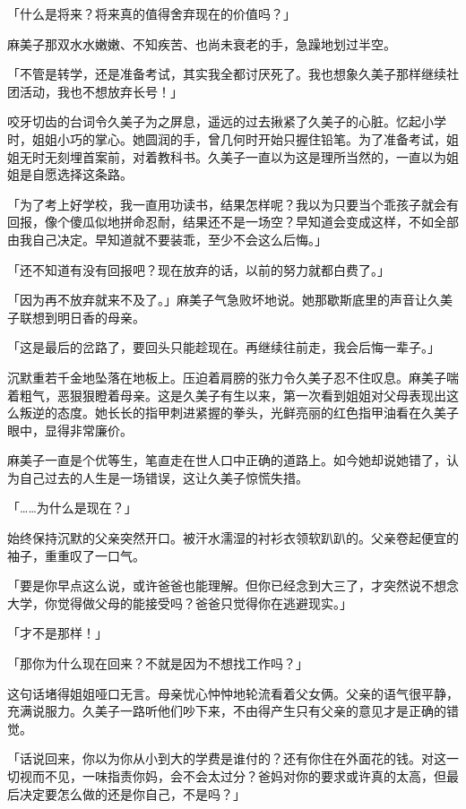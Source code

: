 \documentclass[UTF8]{ctexart}
\begin{document}
    「什么是将来？将来真的值得舍弃现在的价值吗？」 

    麻美子那双水水嫩嫩、不知疾苦、也尚未衰老的手，急躁地划过半空。 

    「不管是转学，还是准备考试，其实我全都讨厌死了。我也想象久美子那样继续社团活动，我也不想放弃长号！」 

    咬牙切齿的台词令久美子为之屏息，遥远的过去揪紧了久美子的心脏。忆起小学时，姐姐小巧的掌心。她圆润的手，曾几何时开始只握住铅笔。为了准备考试，姐姐无时无刻埋首案前，对着教科书。久美子一直以为这是理所当然的，一直以为姐姐是自愿选择这条路。 

    「为了考上好学校，我一直用功读书，结果怎样呢？我以为只要当个乖孩子就会有回报，像个傻瓜似地拼命忍耐，结果还不是一场空？早知道会变成这样，不如全部由我自己决定。早知道就不要装乖，至少不会这么后悔。」 

    「还不知道有没有回报吧？现在放弃的话，以前的努力就都白费了。」 

    「因为再不放弃就来不及了。」麻美子气急败坏地说。她那歇斯底里的声音让久美子联想到明日香的母亲。 

    「这是最后的岔路了，要回头只能趁现在。再继续往前走，我会后悔一辈子。」 

    沉默重若千金地坠落在地板上。压迫着肩膀的张力令久美子忍不住叹息。麻美子喘着粗气，恶狠狠瞪着母亲。这是久美子有生以来，第一次看到姐姐对父母表现出这么叛逆的态度。她长长的指甲刺进紧握的拳头，光鲜亮丽的红色指甲油看在久美子眼中，显得非常廉价。 

    麻美子一直是个优等生，笔直走在世人口中正确的道路上。如今她却说她错了，认为自己过去的人生是一场错误，这让久美子惊慌失措。 

    「……为什么是现在？」 

    始终保持沉默的父亲突然开口。被汗水濡湿的衬衫衣领软趴趴的。父亲卷起便宜的袖子，重重叹了一口气。 

    「要是你早点这么说，或许爸爸也能理解。但你已经念到大三了，才突然说不想念大学，你觉得做父母的能接受吗？爸爸只觉得你在逃避现实。」 

    「才不是那样！」 

    「那你为什么现在回来？不就是因为不想找工作吗？」 

    这句话堵得姐姐哑口无言。母亲忧心忡忡地轮流看着父女俩。父亲的语气很平静，充满说服力。久美子一路听他们吵下来，不由得产生只有父亲的意见才是正确的错觉。 

    「话说回来，你以为你从小到大的学费是谁付的？还有你住在外面花的钱。对这一切视而不见，一味指责你妈，会不会太过分？爸妈对你的要求或许真的太高，但最后决定要怎么做的还是你自己，不是吗？」 
\end{document}
